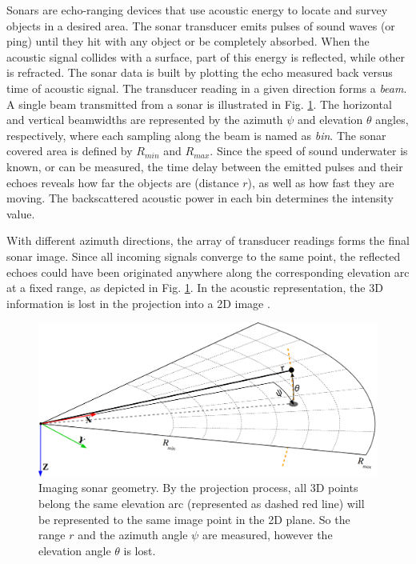 \documentclass[final,5p,times]{elsarticle}
\begin{document}

Sonars are echo-ranging devices that use acoustic energy to locate and survey objects in a desired area. The sonar transducer emits pulses of sound waves (or ping) until they hit with any object or be completely absorbed. When the acoustic signal collides with a surface, part of this energy is reflected, while other is refracted. The sonar data is built by plotting the echo measured back versus time of acoustic signal. The transducer reading in a given direction forms a \textit{beam}. A single beam transmitted from a sonar is illustrated in Fig. \ref{fig:sonar_geometry}. The horizontal and vertical beamwidths are represented by the azimuth $\psi$ and elevation $\theta$ angles, respectively, where each sampling along the beam is named as \textit{bin}. The sonar covered area is defined by $R_{min}$ and $R_{max}$. Since the speed of sound underwater is known, or can be measured, the time delay between the emitted pulses and their echoes reveals how far the objects are (distance $r$), as well as how fast they are moving. The backscattered acoustic power in each bin determines the intensity value.

With different azimuth directions, the array of transducer readings forms the final sonar image. Since all incoming signals converge to the same point, the reflected echoes could have been originated anywhere along the corresponding elevation arc at a fixed range, as depicted in Fig. \ref{fig:sonar_geometry}. In the acoustic representation, the 3D information is lost in the projection into a 2D image \cite{huang2015}.

\begin{figure}[t]
    \includegraphics[width=\columnwidth]{figs/sonar_geometry_2}
    \centering
    \captionsetup{justification=centering}
    \caption{Imaging sonar geometry. By the projection process, all 3D points belong the same elevation arc (represented as dashed red line) will be represented to the same image point in the 2D plane. So the range $r$ and the azimuth angle $\psi$ are measured, however the elevation angle $\theta$ is lost.}
    \label{fig:sonar_geometry}
\end{figure}
\end{document}

